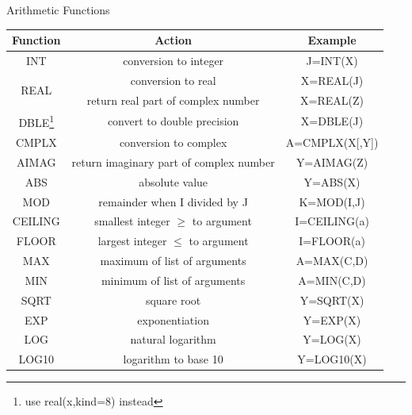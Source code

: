 \documentclass[10pt,t]{beamer}
\begin{document}
\begin{frame}{Arithmetic Functions}
  \footnotesize
  \begin{minipage}{\textwidth}
    \begin{center}
      \begin{tabular}{ccc}
        Function & Action & Example \\
        \hline
        INT & conversion to integer & J=INT(X) \\
        \multirow{2}{*}{REAL} & conversion to real & X=REAL(J) \\
        & return real part of complex number & X=REAL(Z) \\
        DBLE\footnote{\tiny use real(x,kind=8) instead} & convert to double precision & X=DBLE(J) \\
        CMPLX & conversion to complex & A=CMPLX(X[,Y]) \\
        AIMAG & return imaginary part of complex number & Y=AIMAG(Z) \\
        ABS & absolute value & Y=ABS(X) \\
        MOD & remainder when I divided by J & K=MOD(I,J) \\
        CEILING & smallest integer $\ge$ to argument & I=CEILING(a) \\
        FLOOR & largest integer $\le$ to argument & I=FLOOR(a) \\
        MAX & maximum of list of arguments & A=MAX(C,D) \\
        MIN & minimum of list of arguments & A=MIN(C,D) \\
        SQRT & square root & Y=SQRT(X) \\
        EXP & exponentiation & Y=EXP(X) \\
        LOG & natural logarithm & Y=LOG(X) \\
        LOG10 & logarithm to base 10 & Y=LOG10(X) \\
        \hline
      \end{tabular}
    \end{center}
  \end{minipage}
\end{frame}
  
\end{document}
